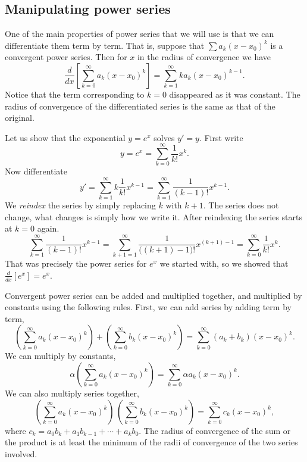 \subsection{Manipulating power series}

One of the main properties of power series that we will use is
that we can differentiate them term by term.  That is,
suppose that 
$\sum a_k {(x-x_0)}^k$ is a convergent power series.  Then
for $x$ in the radius of convergence we have
\begin{equation*}
\frac{d}{dx}
\left[\sum_{k=0}^\infty a_k {(x-x_0)}^k\right]
=
\sum_{k=1}^\infty k a_k {(x-x_0)}^{k-1} .
\end{equation*}
Notice that the term corresponding to $k=0$ disappeared as
it was constant.  The radius of convergence of the differentiated
series is the same as that of the original.

\begin{example}
Let us show that the exponential $y=e^x$ solves $y'=y$.  First write
\begin{equation*}
y = e^x = \sum_{k=0}^\infty \frac{1}{k!} x^k .
\end{equation*}
Now differentiate
\begin{equation*}
y' = \sum_{k=1}^\infty k \frac{1}{k!} x^{k-1} =
\sum_{k=1}^\infty \frac{1}{(k-1)!} x^{k-1} .
\end{equation*}
We \emph{reindex}
the series by simply replacing $k$ with $k+1$.  The series
does not change, what changes is simply how we write it.  After
reindexing the series starts 
at $k=0$ again.
\begin{equation*}
\sum_{k=1}^\infty \frac{1}{(k-1)!} x^{k-1} =
\sum_{k+1=1}^\infty \frac{1}{\bigl((k+1)-1\bigr)!} x^{(k+1)-1} =
\sum_{k=0}^\infty \frac{1}{k!} x^k .
\end{equation*}
That was precisely the power series for $e^x$ we started with,
so we showed that $\frac{d}{dx} [ e^x ] = e^x$.
\end{example}

Convergent power series can be added and multiplied together, and multiplied
by constants using the following rules.  First, we can add series by
adding term by term,
\begin{equation*}
\left(\sum_{k=0}^\infty a_k {(x-x_0)}^k\right)
+
\left(\sum_{k=0}^\infty b_k {(x-x_0)}^k\right)
=
\sum_{k=0}^\infty (a_k+b_k) {(x-x_0)}^k .
\end{equation*}
We can multiply by constants,
\begin{equation*}
\alpha
\left(\sum_{k=0}^\infty a_k {(x-x_0)}^k\right)
=
\sum_{k=0}^\infty \alpha a_k {(x-x_0)}^k .
\end{equation*}
We can also multiply series together,
\begin{equation*}
\left(\sum_{k=0}^\infty a_k {(x-x_0)}^k\right)
\,
\left(\sum_{k=0}^\infty b_k {(x-x_0)}^k\right)
=
\sum_{k=0}^\infty c_k {(x-x_0)}^k ,
\end{equation*}
where
$c_k = a_0b_k + a_1 b_{k-1} + \cdots + a_k b_0$.
The radius of convergence of the sum or the product
is at least the minimum of the radii of convergence of
the two series involved.

